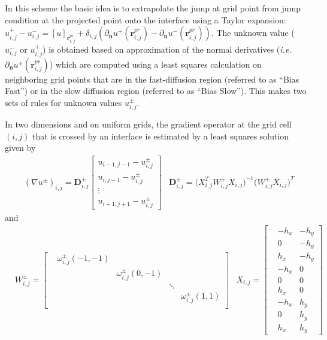 \documentclass{elsarticle}
\begin{document}
In this scheme the basic idea is to extrapolate the jump at grid point from jump condition at the projected point onto the interface using a Taylor expansion: $u^+_{i,j} - u^-_{i,j}=[u]_{\mathbf{r}_{i,j}^{pr}} + \delta_{i,j}(\partial_\mathbf{n}u^+(\mathbf{r}^{pr}_{i,j}) - \partial_\mathbf{n}u^-(\mathbf{r}^{pr}_{i,j})) $. The unknown value ($u^-_{i,j}$ or $u^+_{i,j}$) is obtained based on approximation of the normal derivatives (\textit{i.e.} $\partial_\mathbf{n}u^\pm(\mathbf{r}^{pr}_{i,j})$) which are computed using a least squares calculation on neighboring grid points that are in the fast-diffusion region (referred to as ``Bias Fast'') or in the slow diffusion region (referred to as ``Bias Slow''). This makes two sets of rules for unknown values $u^\pm_{i,j}$.

In two dimensions and on uniform grids, the gradient operator at the grid cell $(i,j)$ that is crossed by an interface is estimated by a least squares solution given by
\begin{align*}
	 & (\nabla u^\pm)_{i,j} = \mathbf{D}^\pm_{i,j} \begin{bmatrix}
		u_{i-1,j-1} - u^\pm_{i,j} \\
		u_{i,j-1} - u^\pm_{i,j}   \\
		\vdots                    \\
		u_{i+1,j+1} - u^\pm_{i,j}
	\end{bmatrix} & \mathbf{D}^\pm_{i,j} = \big(X^T_{i,j} W^\pm_{i,j} X_{i,j} \big)^{-1} \big( W^\pm_{i,j} X_{i,j} \big)^T
\end{align*}
and
\begin{align*}
	 & W^\pm_{i,j} = \begin{bmatrix}
		 & \omega^\pm_{i,j} (-1,-1) &                         &        &                        \\
		 &                          & \omega^\pm_{i,j} (0,-1) &        &                        \\
		 &                          &                         & \ddots &                        \\
		 &                          &                         &        & \omega^\pm_{i,j} (1,1) \\
	\end{bmatrix} & X_{i,j} = \begin{bmatrix}
		 & -h_x & -h_y \\
		 & 0    & -h_y \\
		 & h_x  & -h_y \\
		 & -h_x & 0    \\
		 & 0    & 0    \\
		 & h_x  & 0    \\
		 & -h_x & h_y  \\
		 & 0    & h_y  \\
		 & h_x  & h_y
	\end{bmatrix}
\end{align*}
\end{document}
